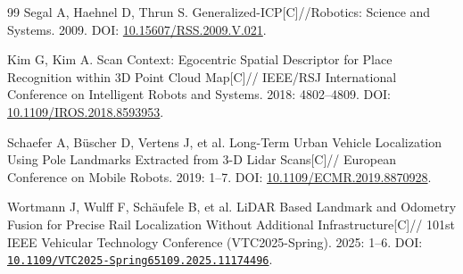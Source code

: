 \documentclass[UTF8,a4paper,12pt,fontset=fandol]{ctexart}
\begin{document}
\begin{thebibliography}{99}
Segal A, Haehnel D, Thrun S.
Generalized-ICP[C]//Robotics: Science and Systems. 2009.
DOI: \href{https://doi.org/10.15607/RSS.2009.V.021}{10.15607/RSS.2009.V.021}.

Kim G, Kim A.
Scan Context: Egocentric Spatial Descriptor for Place Recognition within 3D Point Cloud Map[C]//
IEEE/RSJ International Conference on Intelligent Robots and Systems. 2018: 4802--4809.
DOI: \href{https://doi.org/10.1109/IROS.2018.8593953}{10.1109/IROS.2018.8593953}.

Schaefer A, Büscher D, Vertens J, et al.
Long-Term Urban Vehicle Localization Using Pole Landmarks Extracted from 3-D Lidar Scans[C]//
European Conference on Mobile Robots. 2019: 1--7.
DOI: \href{https://doi.org/10.1109/ECMR.2019.8870928}{10.1109/ECMR.2019.8870928}.

Wortmann J, Wulff F, Schäufele B, et al.
LiDAR Based Landmark and Odometry Fusion for Precise Rail Localization Without Additional Infrastructure[C]//
101st IEEE Vehicular Technology Conference (VTC2025-Spring). 2025: 1--6.
DOI: \href{https://doi.org/10.1109/VTC2025-Spring65109.2025.11174496}{\nolinkurl{10.1109/VTC2025-Spring65109.2025.11174496}}.
\end{thebibliography}
\endgroup
\end{document}
